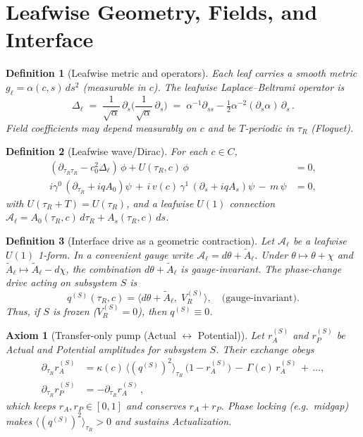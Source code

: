 \documentclass[11pt]{article}
\newtheorem{axiom}{Axiom}
\newtheorem{definition}{Definition}
\begin{document}
\section{Leafwise Geometry, Fields, and Interface}

\begin{definition}[Leafwise metric and operators]
Each leaf carries a smooth metric $g_\ell=\alpha(c,s)\,ds^2$ (measurable in $c$).
The leafwise Laplace--Beltrami operator is
\[
\Delta_\ell \;=\; \frac{1}{\sqrt{\alpha}}\,\partial_s\!\Big(\frac{1}{\sqrt{\alpha}}\,\partial_s\Big)
\;=\; \alpha^{-1}\partial_{ss}-\tfrac12\alpha^{-2}(\partial_s\alpha)\,\partial_s\,.
\]
Field coefficients may depend measurably on $c$ and be $T$-periodic in $\tau_R$ (Floquet).
\end{definition}

\begin{definition}[Leafwise wave/Dirac]
For each $c\in C$,
\begin{align*}
(\partial_{\tau_R\tau_R}-c_0^2\Delta_\ell)\,\phi + U(\tau_R,c)\,\phi&=0,\\
i\gamma^0\,(\partial_{\tau_R}+i q A_0)\psi \,+\, i\,v(c)\,\gamma^1\,(\partial_s+i q A_s)\psi \,-\, m\,\psi&=0,
\end{align*}
with $U(\tau_R{+}T)=U(\tau_R)$, and a leafwise $U(1)$ connection $\mathcal A_\ell=A_0(\tau_R,c)\,d\tau_R + A_s(\tau_R,c)\,ds$.
\end{definition}

\begin{definition}[Interface drive as a geometric contraction]\label{def:drive}
Let $\mathcal A_\ell$ be a leafwise $U(1)$ 1-form. In a convenient gauge write $\mathcal A_\ell=d\theta+\tilde A_\ell$.
Under $\theta\mapsto\theta+\chi$ and $\tilde A_\ell\mapsto\tilde A_\ell-d\chi$, the combination $d\theta+\tilde A_\ell$ is gauge-invariant.
The \emph{phase-change drive} acting on subsystem $S$ is
\begin{equation}
q^{(S)}(\tau_R,c)=\big\langle d\theta+\tilde A_\ell,\;V_R^{(S)}\big\rangle, \quad\text{(gauge-invariant)}.
\end{equation}
Thus, if $S$ is frozen ($V_R^{(S)}=0$), then $q^{(S)}\equiv 0$.
\end{definition}

\begin{axiom}[Transfer-only pump (Actual $\leftrightarrow$ Potential)]
\label{ax:pump}
Let $r_A^{(S)}$ and $r_P^{(S)}$ be Actual and Potential amplitudes for subsystem $S$. Their exchange obeys
\begin{align}
\partial_{\tau_R} r_A^{(S)} &= \kappa(c)\,\big\langle (q^{(S)})^2\big\rangle_{\tau_R}\,\big(1-r_A^{(S)}\big) \, - \, \Gamma(c)\, r_A^{(S)} \, + \, \dots, \nonumber\\
\partial_{\tau_R} r_P^{(S)} &= -\partial_{\tau_R} r_A^{(S)}\,, \label{eq:pump}
\end{align}
which keeps $r_A,r_P\in[0,1]$ and conserves $r_A{+}r_P$. Phase locking (e.g.\ midgap) makes $\langle (q^{(S)})^2\rangle_{\tau_R}>0$ and sustains Actualization.
\end{axiom}
\end{document}
